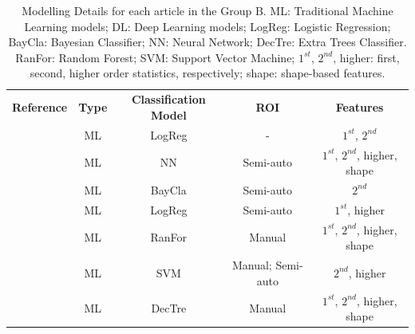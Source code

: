 \documentclass{article}
\begin{document}
\begin{table}[]
    \centering
    \begin{tabular}{ccccc}\toprule
        \multirow{2}{*}{\textbf{Reference}} & \multirow{2}{*}{\textbf{Type}} & \multirow{2}{*}{\textbf{Classification Model}} & \multirow{2}{*}{\textbf{ROI}} & \multirow{2}{*}{\textbf{Features}} \\
        \\ \midrule
        \cite{Shoemaker2018}                & ML                             & LogReg                                         & -                             & $1^{st}$, $2^{nd}$                 \\
        \cite{Koyuncu2019}                  & ML                             & NN                                             & Semi-auto                     & $1^{st}$, $2^{nd}$, higher, shape  \\
        \cite{Li2019}                       & ML                             & BayCla                                         & Semi-auto                     & $2^{nd}$                           \\
        \cite{Andersen2021}                 & ML                             & LogReg                                         & Semi-auto                     & $1^{st}$, higher                   \\
        \cite{Moawad2021}                   & ML                             & RanFor                                         & Manual                        & $1^{st}$, $2^{nd}$, higher, shape  \\
        \cite{Barstugan2020}                & ML                             &
        SVM                                 & Manual; Semi-auto
                                            & $2^{nd}$, higher                                                                                                                                     \\
        \cite{Stanzione2021}                & ML                             & DecTre                                          & Manual                        & $1^{st}$, $2^{nd}$, higher, shape  \\
        \bottomrule
    \end{tabular}
    \caption{Modelling Details for each article in the Group B. ML: Traditional Machine Learning models; DL: Deep Learning models; LogReg: Logistic Regression; BayCla: Bayesian Classifier; NN: Neural Network; DecTre: Extra Trees Classifier.
        RanFor: Random Forest; SVM: Support Vector Machine; $1^{st}$, $2^{nd}$, higher: first, second, higher order statistics, respectively; shape: shape-based features.}
    \label{tab:model_B}
\end{table}
\end{document}
